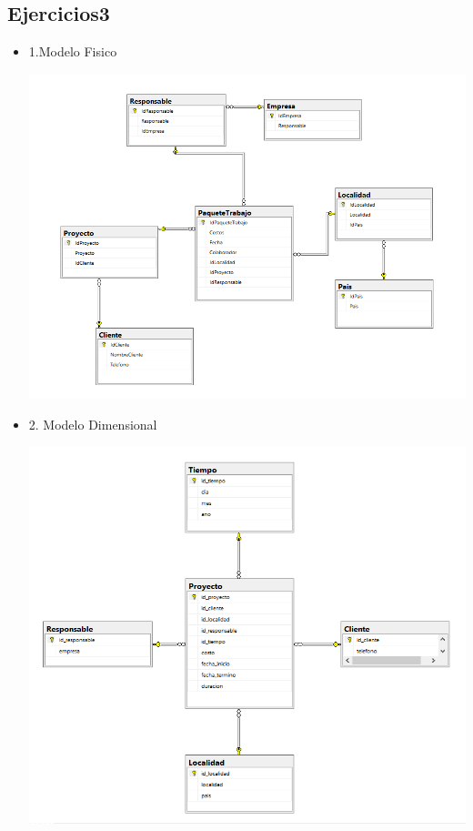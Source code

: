 \subsection {Ejercicios3}
\begin{itemize}
 \item 1.Modelo Fisico
	\begin{center}
	\includegraphics[width=18cm]{./Imagenes/mf3}
	\end{center}	
\newpage
 \item 2. Modelo Dimensional
	\begin{center}
	\includegraphics[width=18cm]{./Imagenes/md3}
	\end{center}	


\end{itemize}

